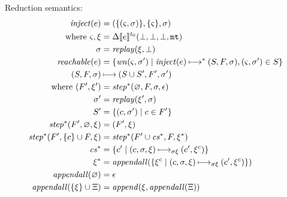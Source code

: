 \documentclass{llncs}
\begin{document}
Reduction semantics:
\begin{align*}
\mathit{inject}(e) &= (\{(\varsigma, \sigma)\}, \{\varsigma\}, \sigma) \\
 \text{ where } \varsigma, \xi &= \Delta\llbracket e\rrbracket^{{t_0}}(\bot,\bot,\bot,{\tt mt}) \\
                \sigma &= \mathit{replay}(\xi,\bot) \\
\mathit{reachable}(e) &= \{\mathit{wn}(\varsigma,\sigma') \mid
                             \mathit{inject}(e) \mathbin{\longmapsto}^* (S,F,\sigma),
                             (\varsigma, \sigma') \in S\} \\
(S,F,\sigma) &\mathbin{\longmapsto} (S \cup S', F', \sigma') \\
 \text{ where }
 (F', \xi') &= \mathit{step}^*(\varnothing, F, \sigma, \epsilon) \\
 \sigma' &= \mathit{replay}(\xi',\sigma) \\
               S' &= \{(c,\sigma') \mid c \in F'\} \\
\mathit{step}^*(F', \varnothing, \xi) &= (F', \xi) \\
\mathit{step}^*(F', \{c\}\cup F, \xi) &= \mathit{step}^*(F'\cup \mathit{cs}^*, F, \xi^*) \\
\mathit{cs}^* &= \{c' \mid (c,\sigma,\xi) \mathbin{\longmapsto_{\mathit{\sigma\xi}}} (c',\xi^c) \} \\
\xi^* &= \mathit{appendall}(\{\xi^c \mid (c, \sigma,\xi) \mathbin{\longmapsto_{\mathit{\sigma\xi}}} (c', \xi^c)\}) \\
\mathit{appendall}(\varnothing) &= \epsilon \\
\mathit{appendall}(\{\xi\}\cup\Xi) &= \mathit{append}(\xi,\mathit{appendall}(\Xi))
\end{align*}

\end{document}
